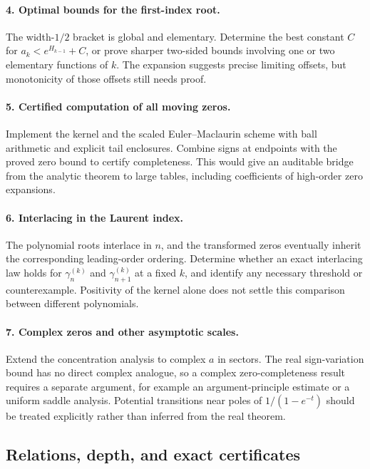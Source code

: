 \paragraph{4. Optimal bounds for the first-index root.}
The width-$1/2$ bracket is global and elementary.  Determine the best
constant $C$ for $a_k<e^{H_{k-1}}+C$, or prove sharper two-sided
bounds involving one or two elementary functions of $k$.
The expansion suggests precise limiting offsets, but monotonicity of
those offsets still needs proof.

\paragraph{5. Certified computation of all moving zeros.}
Implement the kernel and the scaled Euler--Maclaurin scheme with ball
arithmetic and explicit tail enclosures.  Combine signs at endpoints
with the proved zero bound to certify completeness.  This would give
an auditable bridge from the analytic theorem to large tables,
including coefficients of high-order zero expansions.

\paragraph{6. Interlacing in the Laurent index.}
The polynomial roots interlace in $n$, and the transformed zeros
eventually inherit the corresponding leading-order ordering.
Determine whether an exact interlacing law holds for
$\gamma_n^{(k)}$ and $\gamma_{n+1}^{(k)}$ at a fixed $k$, and identify
any necessary threshold or counterexample.  Positivity of the kernel
alone does not settle this comparison between different polynomials.

\paragraph{7. Complex zeros and other asymptotic scales.}
Extend the concentration analysis to complex $a$ in sectors.
The real sign-variation bound has no direct complex analogue, so a
complex zero-completeness result requires a separate argument, for
example an argument-principle estimate or a uniform saddle analysis.
Potential transitions near poles of $1/(1-e^{-t})$ should be treated
explicitly rather than inferred from the real theorem.

\subsection{Relations, depth, and exact certificates}

